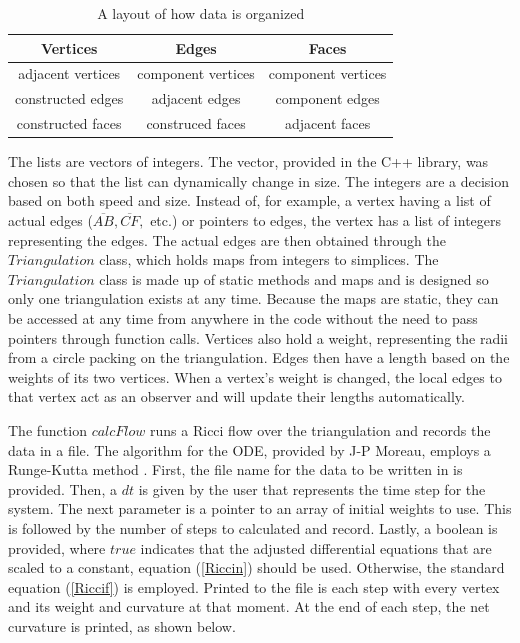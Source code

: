 \documentclass[12pt]{article}
\begin{document}
  \begin{table}[b]
  \begin{center}
  \begin{tabular}{|c|c|c|}
  \hline
  Vertices & Edges & Faces\\
  \hline
  adjacent vertices & component vertices & component vertices\\
  constructed edges & adjacent edges & component edges\\
  constructed faces & construced faces & adjacent faces\\
  \hline
  \end{tabular}
  \end{center}
  \caption{A layout of how data is organized}
  \label{geomat}
  \end{table}
  
\noindent The lists are vectors of integers. The vector, provided in the C++ library, was chosen so that the list can dynamically change in size. The integers are a decision based on both speed and size. Instead of, for example, a vertex having a list of actual edges ($\overline{AB}, \overline{CF},$ etc.) or pointers to edges, the vertex has a list of integers representing the edges. The actual edges are then obtained through the $Triangulation$ class, which holds maps from integers to simplices. The $Triangulation$ class is made up of static methods and maps and is designed so only one triangulation exists at any time. Because the maps are static, they can be accessed at any time from anywhere in the code without the need to pass pointers through function calls. Vertices also hold a weight, representing the radii from a circle packing on the triangulation. Edges then have a length based on the weights of its two vertices. When a vertex's weight is changed, the local edges to that vertex act as an observer and will update their lengths automatically.\newline

\noindent The function $calcFlow$ runs a Ricci flow over the triangulation and records the data in a file. The algorithm for the ODE, provided by J-P Moreau, employs a Runge-Kutta method \cite{JPM}. First, the file name for the data to be written in is provided. Then, a $dt$ is given by the user that represents the time step for the system. The next parameter is a pointer to an array of initial weights to use. This is followed by the number of steps to calculated and record. Lastly, a boolean is provided, where $true$ indicates that the adjusted differential equations that are scaled to a constant, equation (\ref{Riccin}) should be used. Otherwise, the standard equation (\ref{Riccif}) is employed. Printed to the file is each step with every vertex and its weight and curvature at that moment. At the end of each step, the net curvature is printed, as shown below.
\end{document}
